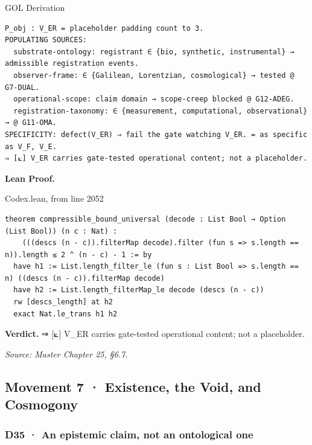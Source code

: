 \documentclass[10pt,twocolumn]{article}
\begin{document}
\begin{golbox}{GOL Derivation}
\begin{lstlisting}[style=golv]
P_obj : V_ER = placeholder padding count to 3.
POPULATING SOURCES:
  substrate-ontology: registrant ∈ {bio, synthetic, instrumental} → admissible registration events.
  observer-frame: ∈ {Galilean, Lorentzian, cosmological} → tested @ G7-DUAL.
  operational-scope: claim domain → scope-creep blocked @ G12-ADEG.
  registration-taxonomy: ∈ {measurement, computational, observational} → @ G11-OMA.
SPECIFICITY: defect(V_ER) ⇒ fail the gate watching V_ER. = as specific as V_F, V_E.
⇒ [⟀] V_ER carries gate-tested operational content; not a placeholder.
\end{lstlisting}
\end{golbox}

\textbf{Lean Proof.}

\begin{leanexcerpt}{Codex.lean, from line 2052}
\begin{lstlisting}[style=leanx,firstnumber=2052]
theorem compressible_bound_universal (decode : List Bool → Option (List Bool)) (n c : Nat) :
    (((descs (n - c)).filterMap decode).filter (fun s => s.length == n)).length ≤ 2 ^ (n - c) - 1 := by
  have h1 := List.length_filter_le (fun s : List Bool => s.length == n) ((descs (n - c)).filterMap decode)
  have h2 := List.length_filterMap_le decode (descs (n - c))
  rw [descs_length] at h2
  exact Nat.le_trans h1 h2
\end{lstlisting}
\end{leanexcerpt}

\textbf{Verdict.} ⇒ {[}⟀{]} V\_ER carries gate-tested operational
content; not a placeholder.

\emph{Source: Master Chapter 25, §6.7.}

\hypertarget{movement-7-existence-the-void-and-cosmogony}{%
\subsection{Movement 7 · Existence, the Void, and
Cosmogony}\label{movement-7-existence-the-void-and-cosmogony}}

\hypertarget{d35-an-epistemic-claim-not-an-ontological-one}{%
\subsubsection{D35 · An epistemic claim, not an ontological
one}\label{d35-an-epistemic-claim-not-an-ontological-one}}
\end{document}
